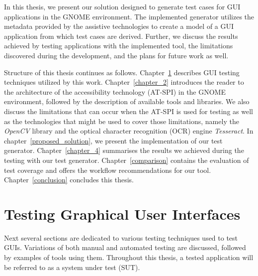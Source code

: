 In this thesis, we present our solution designed to generate test cases for GUI applications in the GNOME environment. The implemented generator utilizes the metadata provided by the assistive technologies to create a model of a GUI application from which test cases are derived. Further, we discuss the results achieved by testing applications with the implemented tool, the limitations discovered during the development, and the plans for future work as well.


Structure of this thesis continues as follows. Chapter~\ref{chapter_1} describes GUI testing techniques utilized by this work. Chapter~\ref{chapter_2} introduces the reader to the architecture of the accessibility technology (AT-SPI) in the GNOME environment, followed by the description of available tools and libraries. We also discuss the limitations that can occur when the AT-SPI is used for testing as well as the technologies that might be used to cover those limitations, namely the \textit{OpenCV} library and the optical character recognition (OCR) engine \textit{Tesseract}. In chapter~\ref{proposed_solution}, we present the implementation of our test generator. Chapter~\ref{chapter_4} summarises the results we achieved during the testing with our test generator. Chapter~\ref{comparison} contains the evaluation of test coverage and offers the workflow recommendations for our tool. Chapter~\ref{conclusion} concludes this thesis.

\chapter{Testing Graphical User Interfaces}\label{chapter_1}


Next several sections are dedicated to various testing techniques used to test GUIs. Variations of both manual and automated testing are discussed, followed by examples of tools using them. Throughout this thesis, a tested application will be referred to as a system under test (SUT).

